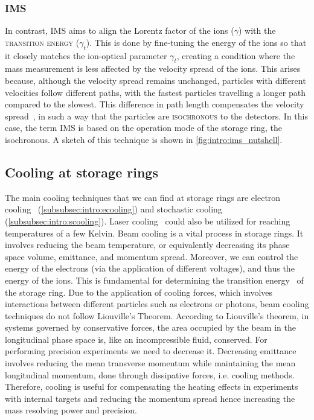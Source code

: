 \subsubsection{\textsc{IMS}}\label{subsubsec:intro:isoMS}

In contrast, \textsc{IMS} aims to align the Lorentz factor of the ions ($\gamma$) with the \textsc{transition energy} ($\gamma_t$). This is done by fine-tuning the energy of the ions so that it closely matches the ion-optical parameter $\gamma_t$, creating a condition where the mass measurement is less affected by the velocity spread of the ions. This arises because, although the velocity spread remains unchanged, particles with different velocities follow different paths, with the fastest particles travelling a longer path compared to the slowest. This difference in path length compensates the velocity spread~\cite{transitioncrossing}, in such a way that the particles are \textsc{isochronous} to the detectors. In this case, the term \textsc{IMS} is based on the operation mode of the storage ring, the isochronous. A sketch of this technique is shown in \cref{fig:intro:ims_nutshell}.


\subsection{Cooling at storage rings}\label{subsec:intro:cooling}
The main cooling techniques that we can find at storage rings are electron cooling~\cite{ecooling1} (\cref{subsubsec:intro:ecooling}) and stochastic cooling~\cite{stochasticcooling1} (\cref{subsubsec:intro:scooling}). Laser cooling~\cite{laserTSR} could also be utilized for reaching temperatures of a few Kelvin.
\newpar
Beam cooling is a vital process in storage rings. It involves reducing the beam temperature, or equivalently decreasing its phase space volume, emittance, and momentum spread. Moreover, we can control the energy of the electrons (via the application of different voltages), and thus the energy of the ions. This is fundamental for determining the transition energy~\cite{transitioncrossing} of the storage ring.
Due to the application of cooling forces, which involves interactions between different particles such as electrons or photons, beam cooling techniques do not follow Liouville's Theorem.
\newpar
According to Liouville's theorem, in systems governed by conservative forces, the area occupied by the beam in the longitudinal phase space is, like an incompressible fluid, conserved.
For performing precision experiments we need to decrease it. Decreasing emittance involves reducing the mean transverse momentum while maintaining the mean longitudinal momentum, done through dissipative forces, i.e. cooling methods. Therefore, cooling is useful for compensating the heating effects in experiments with internal targets and reducing the momentum spread hence increasing the mass resolving power and precision.

